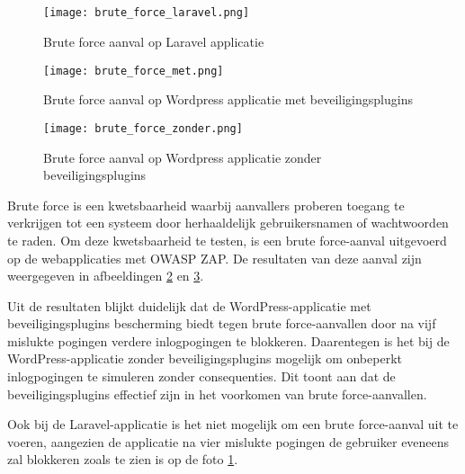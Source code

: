 \subsection{}
\begin{figure}
    \centering
    \texttt{[image: brute\_force\_laravel.png]}
    \caption[Brute force aanval op Laravel applicatie]{Brute force aanval op Laravel applicatie}
    \label{fig:brute_force_laravel}
\end{figure}
\begin{figure}
    \centering
    \texttt{[image: brute\_force\_met.png]}
    \caption[Brute force aanval op Wordpress applicatie met beveiligingsplugins]{Brute force aanval op Wordpress applicatie met beveiligingsplugins}
    \label{fig:brute_force_met}
\end{figure}
\begin{figure}
    \centering
    \texttt{[image: brute\_force\_zonder.png]}
    \caption[Brute force aanval op Wordpress applicatie zonder beveiligingsplugins]{Brute force aanval op Wordpress applicatie zonder beveiligingsplugins}
    \label{fig:brute_force_zonder}
\end{figure}

Brute force is een kwetsbaarheid waarbij aanvallers proberen toegang te verkrijgen tot een systeem door herhaaldelijk gebruikersnamen 
of wachtwoorden te raden. Om deze kwetsbaarheid te testen, is een brute force-aanval uitgevoerd op de webapplicaties met OWASP ZAP. De 
resultaten van deze aanval zijn weergegeven in afbeeldingen \ref{fig:brute_force_met} en \ref{fig:brute_force_zonder}. 

Uit de resultaten blijkt duidelijk dat de WordPress-applicatie met beveiligingsplugins bescherming biedt tegen brute 
force-aanvallen door na vijf mislukte pogingen verdere inlogpogingen te blokkeren. Daarentegen is het bij de 
WordPress-applicatie zonder beveiligingsplugins mogelijk om onbeperkt inlogpogingen te simuleren zonder consequenties. Dit toont 
aan dat de beveiligingsplugins effectief zijn in het voorkomen van brute force-aanvallen.

Ook bij de Laravel-applicatie is het niet mogelijk om een brute force-aanval uit te voeren, aangezien de applicatie na vier 
mislukte pogingen de gebruiker eveneens zal blokkeren zoals te zien is op de foto \ref{fig:brute_force_laravel}.

